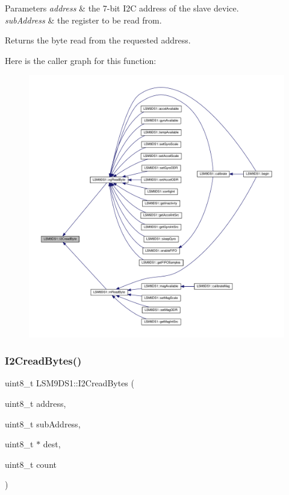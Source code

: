 \begin{DoxyParams}{Parameters}
{\em address} & the 7-\/bit I2C address of the slave device. \\
\hline
{\em sub\+Address} & the register to be read from. \\
\hline
\end{DoxyParams}
\begin{DoxyReturn}{Returns}
the byte read from the requested address. 
\end{DoxyReturn}
Here is the caller graph for this function\+:
\nopagebreak
\begin{figure}[H]
\begin{center}
\leavevmode
\includegraphics[width=350pt]{classLSM9DS1_a7fc046d4b335494331905fdeb5c81c9e_icgraph}
\end{center}
\end{figure}
\mbox{\label{classLSM9DS1_adfc9a22290daddd7787e8023fa8f12cc}} 
\subsubsection{\texorpdfstring{I2\+Cread\+Bytes()}{I2CreadBytes()}}
{\footnotesize\ttfamily uint8\+\_\+t L\+S\+M9\+D\+S1\+::\+I2\+Cread\+Bytes (\begin{DoxyParamCaption}\item[{uint8\+\_\+t}]{address,  }\item[{uint8\+\_\+t}]{sub\+Address,  }\item[{uint8\+\_\+t $\ast$}]{dest,  }\item[{uint8\+\_\+t}]{count }\end{DoxyParamCaption})\hspace{0.3cm}{\ttfamily [protected]}}



